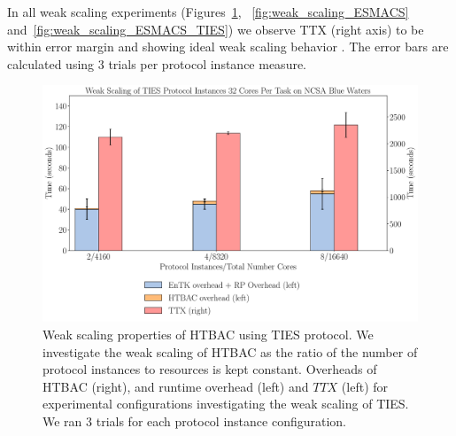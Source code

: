 In all weak scaling experiments (Figures~\ref{fig:weak_scaling_TIES},
~\ref{fig:weak_scaling_ESMACS} and~\ref{fig:weak_scaling_ESMACS_TIES}) we
observe TTX (right axis) to be within error margin and showing ideal weak
scaling behavior . The error bars are calculated
using 3 trials per protocol instance measure.

\begin{figure}
  \centering
    \includegraphics[width=\columnwidth]{figures/new_ws_ties.pdf}
    \caption{Weak scaling properties of HTBAC using TIES protocol. We
    investigate the weak scaling of HTBAC as the ratio of the number of
    protocol instances to resources is kept constant. Overheads of HTBAC
    (right), and runtime overhead (left) and \(TTX\) (left) for experimental
    configurations investigating the weak scaling of TIES. We ran 3 trials
    for each protocol instance configuration.}
\label{fig:weak_scaling_TIES}
\end{figure}

